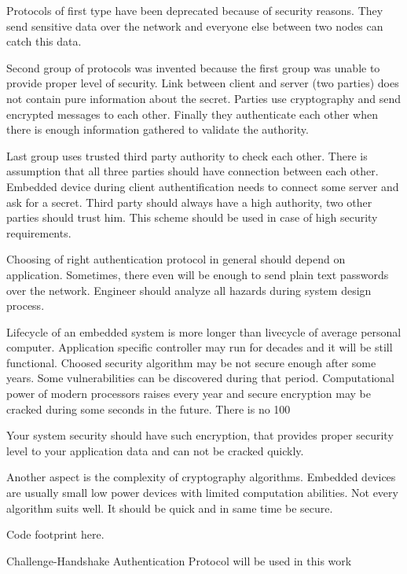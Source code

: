 Protocols of first type have been deprecated because of security reasons. They
send sensitive data over the network and everyone else between two nodes can
catch this data.

Second group of protocols was invented because the first group was unable to
provide proper level of security. Link between client and server (two parties)
does not contain pure information about the secret. Parties use cryptography and
send encrypted messages to each other. Finally they authenticate each other when there is enough information gathered to validate the authority.

Last group uses trusted third party authority to check each other. There is
assumption that all three parties should have connection between each other. Embedded device during
client authentification needs to connect some server and ask for a secret. Third
party should always have a high authority, two other parties should trust him.
This scheme should be used in case of high security requirements.



Choosing of right authentication protocol in general should depend on application. Sometimes, there even will be enough to send plain text passwords over the network. Engineer should analyze all hazards during system design process.

Lifecycle of an embedded system is more longer than livecycle of average personal computer. Application specific controller  may run for decades and it will be still functional.
Choosed security algorithm may be not secure enough after some years. Some vulnerabilities can be discovered during that period. 
Computational power of modern processors raises every year and  secure encryption may be cracked during some seconds in the future.
There is no 100%

Your system security should have such encryption, that provides proper security level to your application data and can not be cracked quickly.

Another aspect is the complexity of cryptography algorithms. Embedded devices are usually small low power devices with limited computation abilities. Not every algorithm suits well. It should be quick and in same time be secure.

Code footprint here.

Challenge-Handshake Authentication Protocol will be used in this work




